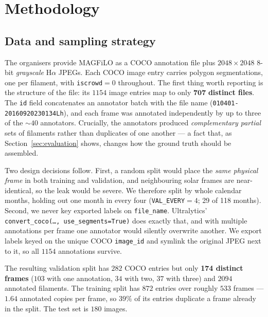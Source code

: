 \documentclass[sigconf]{acmart}
\begin{document}
\section{Methodology}\label{sec:methodology}

\subsection{Data and sampling strategy}
The organisers provide MAGFiLO \cite{ahmadzadeh2024dataset} as a COCO annotation file plus $2048\times2048$ 8-bit \emph{grayscale} H$\alpha$ JPEGs. Each COCO image entry carries polygon segmentations, one per filament, with \texttt{iscrowd}$=0$ throughout. The first thing worth reporting is the structure of the file: its $1154$ image entries map to only $\mathbf{707}$ \textbf{distinct files}. The \texttt{id} field concatenates an annotator batch with the file name (\texttt{010401-20160920230134Lh}), and each frame was annotated independently by up to three of the $\sim\!40$ annotators. Crucially, the annotators produced \emph{complementary partial} sets of filaments rather than duplicates of one another --- a fact that, as Section~\ref{sec:evaluation} shows, changes how the ground truth should be assembled.

Two design decisions follow. First, a random split would place the \emph{same physical frame} in both training and validation, and neighbouring solar frames are near-identical, so the leak would be severe. We therefore split by whole calendar months, holding out one month in every four (\texttt{VAL\_EVERY}$=4$; 29 of 118 months). Second, we never key exported labels on \texttt{file\_name}. Ultralytics' \texttt{convert\_coco(\ldots, use\_segments=True)} does exactly that, and with multiple annotations per frame one annotator would silently overwrite another. We export labels keyed on the unique COCO \texttt{image\_id} and symlink the original JPEG next to it, so all $1154$ annotations survive.

The resulting validation split has $282$ COCO entries but only \textbf{174 distinct frames} ($103$ with one annotation, $34$ with two, $37$ with three) and $2094$ annotated filaments. The training split has $872$ entries over roughly $533$ frames --- $1.64$ annotated copies per frame, so $39\%$ of its entries duplicate a frame already in the split. The test set is $180$ images.
\end{document}

